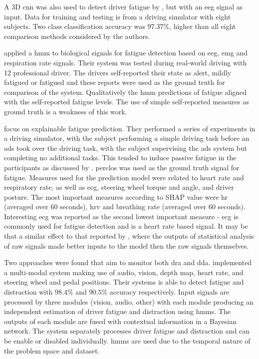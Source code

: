 \documentclass[11pt, parskip=half*,twoside=false]{scrbook}
\begin{document}
A 3D \gls{cnn} was also used to detect driver fatigue by \citet{gaoEEGBasedSpatioTemporal2019}, but with an  \gls{eeg} signal as input. Data for training and testing is from a driving simulator with eight subjects. Two class classification accuracy was $97.37\%$, higher than all eight comparison methods considered by the authors.

\citet{fuDynamicDriverFatigue2016} applied a \gls{hmm} to biological signals for fatigue detection based on \gls{eeg}, \gls{emg} and respiration rate signals. Their system was tested during real-world driving with 12 professional driver. The drivers self-reported their state as alert, mildly fatigued or fatigued and these reports were used as the ground truth for comparison of the system. Qualitatively the \gls{hmm} predictions of fatigue aligned with the self-reported fatigue levels. The use of simple self-reported measures as ground truth is a weakness of this work.

\citet{zhouPredictingDriverFatigue2021} focus on explainable fatigue prediction. They performed a series of experiments in a driving simulator, with the subject performing a simple driving task before an \gls{ads} took over the driving task, with the subject supervising the \gls{ads} system but completing no additional tasks. This tended to induce passive fatigue in the participants as discussed by \citep{goncalvesDrowsinessConditionalAutomation2016}. \gls{perclos} was used as the ground truth signal for fatigue. Measures used for the prediction model were related to heart rate and respiratory rate, as well as \gls{ecg}, steering wheel torque and angle, and driver posture. The most important measures according to SHAP value were \gls{hr} (averaged over 60 seconds), \gls{hrv} and breathing rate (averaged over 60 seconds). Interesting \gls{ecg} was reported as the second lowest important measure - \gls{ecg} is commonly used for fatigue detection and is a heart rate based signal. It may be that a similar effect to that reported by \citet{wollmerOnlineDriverDistraction2011}, where the outputs of statistical analysis of raw signals made better inputs to the model then the raw signals themselves.
 
Two approaches were found that aim to monitor both \gls{dra} and \gls{dda}. \citet{crayeMultiModalDriverFatigue2016} implemented a multi-modal system making use of audio, vision, depth map, heart rate, and steering wheel and pedal positions. Their systems is able to detect fatigue and distraction with $98.4\%$ and $90.5\%$ accuracy respectively. Input signals are processed by three modules (vision, audio, other) with each module producing an independent estimation of driver fatigue and distraction using \glspl{hmm}. The outputs of each module are fused with contextual information in a Bayesian network. The system separately processes driver fatigue and distraction and can be enable or disabled individually. \Glspl{hmm} are used due to the temporal nature of the problem space and dataset.
\end{document}
